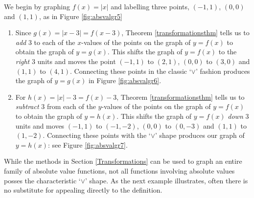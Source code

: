 {
We begin by graphing $f(x) = |x|$ and labelling three points, $(-1,1)$, $(0,0)$ and $(1,1)$, as in Figure \ref{fig:absvalgr5}


\begin{enumerate}

\item Since $g(x) = |x-3| = f(x-3)$, Theorem \ref{transformationsthm} tells us to \textit{add} $3$ to each of the $x$-values of the points on the graph of $y=f(x)$ to obtain the graph of $y=g(x)$.   This shifts the graph of $y=f(x)$ to the \textit{right} $3$ units and moves the point $(-1,1)$ to $(2,1)$,  $(0,0)$ to $(3,0)$ and $(1,1)$ to $(4,1)$.  Connecting these points in the classic `$\vee$' fashion produces the graph of $y = g(x)$ in Figure \ref{fig:absvalgr6}.


\item For $h(x) = |x| - 3 = f(x) -3$, Theorem \ref{transformationsthm} tells us to \textit{subtract} $3$ from each of the $y$-values of the points on the graph of $y=f(x)$ to obtain the graph of $y = h(x)$.  This shifts the graph of $y=f(x)$ \textit{down} $3$ units and moves $(-1,1)$ to $(-1,-2)$, $(0,0)$ to $(0,-3)$ and $(1,1)$ to $(1,-2)$.  Connecting these points with the `$\vee$' shape produces our graph of $y=h(x)$: see Figure \ref{fig:absvalgr7}.


\end{enumerate}
}

\medskip

While the methods in Section \ref{Transformations} can be used to graph an entire family of absolute value functions, not all functions involving absolute values posses the characteristic `$\vee$' shape.  As the next example illustrates, often there is no substitute for appealing directly to the definition.



